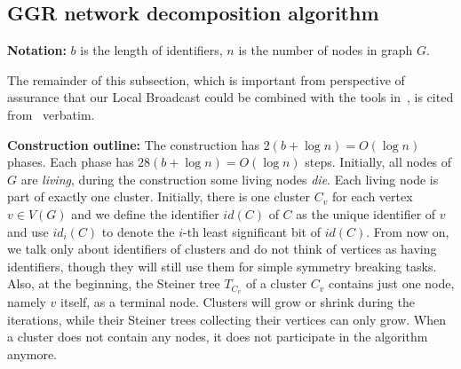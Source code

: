 



\subsection{GGR network decomposition algorithm}
\label{sec:Ghaffari-verbatim}

\noindent\textbf{Notation:} $b$ is the length of identifiers, $n$ is the number of nodes in graph $G$.

The remainder of this subsection, which is important from perspective of assurance that our Local Broadcast could be combined with the tools in~\cite{ghaffari2021improved}, is cited from~\cite{ghaffari2021improved} verbatim.

\noindent\textbf{Construction  outline:}   The  construction  has  $2(b+\log n) =O(\log n)$ phases. Each phase has $28(b+\log n) =O(\log n)$ steps.  Initially, all nodes of $G$ are \emph{living}, during the construction some living nodes \emph{die}. Each living node is  part  of  exactly  one  cluster.   Initially,  there  is  one cluster $C_v$ for each vertex $v\in V(G)$ and we define the identifier $id(C)$ of $C$ as the unique identifier of $v$ and use $id_i(C)$  to  denote  the $i$-th  least  significant  bit  of  $id(C)$. From now on, we talk only about identifiers of clusters and do not think of vertices as having identifiers, though they will still use them for simple symmetry breaking tasks.   Also,  at  the  beginning,  the  Steiner  tree $T_{C_v}$ of a cluster $C_v$ contains just one node, namely $v$ itself, as a  terminal  node.   Clusters  will  grow  or  shrink  during the iterations, while their Steiner trees collecting their vertices can only grow.  When a cluster does not contain any nodes, it does not participate in the algorithm anymore.

